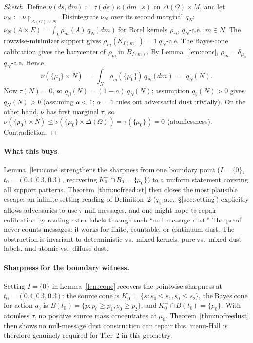 \documentclass[11pt]{article}
\theoremstyle{definition}
\theoremstyle{remark}
\newcommand{\Om}{\Omega}
\begin{document}
\begin{proof}[Sketch]
Define $\nu(ds, dm) := \tau(ds)\,\kappa(dm\mid s)$ on
$\Delta(\Om)\times M$, and let $\nu_N := \nu\!\restriction_{\Delta(\Om)\times N}$.
Disintegrate $\nu_N$ over its second marginal $q_N$: $\nu_N(A\times E) =
\int_E\rho_m(A)\,q_N(dm)$ for Borel kernels $\rho_m$, $q_N$-a.e.\ $m\in N$.
The rowwise-minimizer support gives $\rho_m(K_{I(m)}^-) = 1$ $q_N$-a.e.
The Bayes-cone calibration gives the barycenter of $\rho_m$ in
$B_{I(m)}$. By Lemma~\ref{lem:cone}, $\rho_m = \delta_{\mu_0}$ $q_N$-a.e.
Hence
\[
  \nu(\{\mu_0\}\times N) \;=\; \int_N\rho_m(\{\mu_0\})\,q_N(dm) \;=\; q_N(N).
\]
Now $\tau(N) = 0$, so $q_\beta(N) = (1-\alpha)\,q_N(N)$; assumption
$q_\beta(N) > 0$ gives $q_N(N) > 0$ (assuming $\alpha < 1$; $\alpha = 1$
rules out adversarial dust trivially). On the other hand, $\nu$ has
first marginal $\tau$, so
$\nu(\{\mu_0\}\times N) \le \nu(\{\mu_0\}\times\Delta(\Om)) = \tau(\{\mu_0\}) = 0$
(atomlessness). Contradiction.
\end{proof}

\paragraph{What this buys.} Lemma~\ref{lem:cone} strengthens the
sharpness from one boundary point ($I = \{0\}$, $t_0 =
(0.4,0.3,0.3)$, recovering $K_0^- \cap B_0 = \{\mu_0\}$) to a uniform
statement covering all support patterns. Theorem~\ref{thm:nofreedust}
then closes the most plausible escape: an infinite-setting reading of
Definition~2 ($q_\beta$-a.e., \S\ref{sec:setting}) explicitly allows
adversaries to use $\tau$-null messages, and one might hope to repair
calibration by routing extra labels through such ``null-message
dust.'' The proof never counts messages: it works for finite,
countable, or continuum dust. The obstruction is invariant to
deterministic vs.\ mixed kernels, pure vs.\ mixed dust labels, and
atomic vs.\ diffuse dust.

\paragraph{Sharpness for the boundary witness.} Setting $I = \{0\}$
in Lemma~\ref{lem:cone} recovers the pointwise sharpness at
$t_0 = (0.4, 0.3, 0.3)$: the source cone is $K_0^- = \{s : s_0\le s_1,
s_0\le s_2\}$, the Bayes cone for action $a_0$ is $B(t_0) = \{p :
p_0\ge p_1, p_0\ge p_2\}$, and $K_0^- \cap B(t_0) = \{\mu_0\}$. With
atomless $\tau$, no positive source mass concentrates at $\mu_0$.
Theorem~\ref{thm:nofreedust} then shows no null-message dust
construction can repair this. menu-Hall is therefore genuinely
required for Tier~2 in this geometry.
\end{document}
